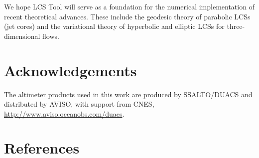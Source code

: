 \documentclass[5p]{elsarticle}
\begin{document}
We hope LCS Tool will serve as a foundation for the numerical implementation of recent theoretical advances.
These include the geodesic theory of parabolic LCSs (jet cores)\citep{farazmand14:_shearless} and the variational theory of hyperbolic and elliptic LCSs for three-dimensional flows\citep{blazevski14:_hyper_ellip_trans_barrier_three}.

\section*{Acknowledgements}

\begin{sloppypar}
The altimeter products used in this work are produced by SSALTO/DUACS and distributed by AVISO, with support from CNES, \url{http://www.aviso.oceanobs.com/duacs}.
\end{sloppypar}

\section*{References}

 

\end{document}

